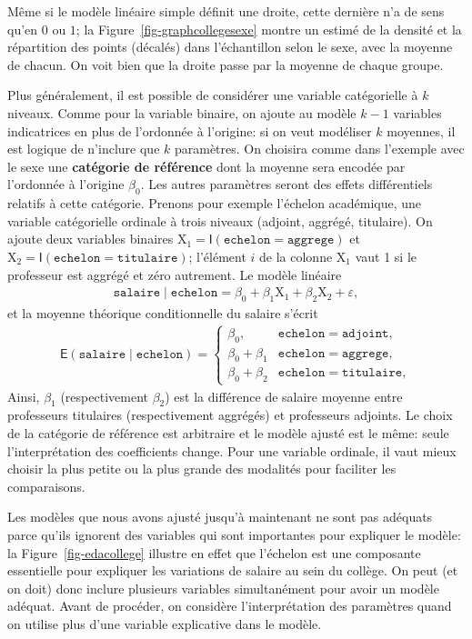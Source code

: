 \documentclass[
  11pt,
  letterpaper,
]{scrbook}
\theoremstyle{definition}
\theoremstyle{remark}
\begin{document}
Même si le modèle linéaire simple définit une droite, cette dernière n'a
de sens qu'en \(0\) ou \(1\); la Figure~\ref{fig-graphcollegesexe}
montre un estimé de la densité et la répartition des points (décalés)
dans l'échantillon selon le sexe, avec la moyenne de chacun. On voit
bien que la droite passe par la moyenne de chaque groupe.

Plus généralement, il est possible de considérer une variable
catégorielle à \(k\) niveaux. Comme pour la variable binaire, on ajoute
au modèle \(k-1\) variables indicatrices en plus de l'ordonnée à
l'origine: si on veut modéliser \(k\) moyennes, il est logique de
n'inclure que \(k\) paramètres. On choisira comme dans l'exemple avec le
sexe une \textbf{catégorie de référence} dont la moyenne sera encodée
par l'ordonnée à l'origine \(\beta_0\). Les autres paramètres seront des
effets différentiels relatifs à cette catégorie. Prenons pour exemple
l'échelon académique, une variable catégorielle ordinale à trois niveaux
(adjoint, aggrégé, titulaire). On ajoute deux variables binaires
\(\mathrm{X}_1 = \mathsf{I}(\texttt{echelon}=\texttt{aggrege})\) et
\(\mathrm{X}_2 = \mathsf{I}(\texttt{echelon}=\texttt{titulaire})\);
l'élément \(i\) de la colonne \(\mathrm{X}_1\) vaut 1 si le professeur
est aggrégé et zéro autrement. Le modèle linéaire \begin{align*}
\texttt{salaire} \mid \texttt{echelon}=\beta_0 + \beta_1 \mathrm{X}_1+\beta_2\mathrm{X}_2 + \varepsilon,
\end{align*} et la moyenne théorique conditionnelle du salaire s'écrit
\begin{align*}
\mathsf{E}(\texttt{salaire} \mid \texttt{echelon})= \begin{cases}
\beta_0, & \texttt{echelon}=\texttt{adjoint},\\
\beta_0 + \beta_1 & \texttt{echelon}=\texttt{aggrege},\\
\beta_0 + \beta_2 & \texttt{echelon}=\texttt{titulaire},
\end{cases}
\end{align*} Ainsi, \(\beta_1\) (respectivement \(\beta_2\)) est la
différence de salaire moyenne entre professeurs titulaires
(respectivement aggrégés) et professeurs adjoints. Le choix de la
catégorie de référence est arbitraire et le modèle ajusté est le même:
seule l'interprétation des coefficients change. Pour une variable
ordinale, il vaut mieux choisir la plus petite ou la plus grande des
modalités pour faciliter les comparaisons.

Les modèles que nous avons ajusté jusqu'à maintenant ne sont pas
adéquats parce qu'ils ignorent des variables qui sont importantes pour
expliquer le modèle: la Figure~\ref{fig-edacollege} illustre en effet
que l'échelon est une composante essentielle pour expliquer les
variations de salaire au sein du collège. On peut (et on doit) donc
inclure plusieurs variables simultanément pour avoir un modèle adéquat.
Avant de procéder, on considère l'interprétation des paramètres quand on
utilise plus d'une variable explicative dans le modèle.
\end{document}
